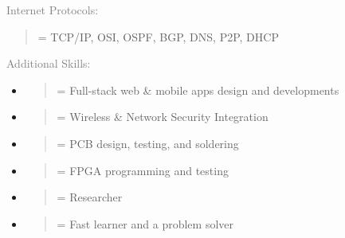 \documentclass[letterpage]{article}
\newlength{\quoteleftskip}            %
\newlength{\quoteleftskipAdditional}  %
\begin{document}
\begin{minipage}[t]{0.424\linewidth}
  \vspace{7px}
  \textcolor{gray}{Internet Protocols:}  \\
  \begin{quote}
      \leftskip=\quoteleftskip
      \textmd{TCP/IP, OSI, OSPF, BGP, DNS, P2P, DHCP}\\
  \end{quote}

  \vspace{7px}
  \textcolor{gray}{Additional Skills:}  \\
  \begin{itemize}[leftmargin=10pt, labelindent=0pt, labelsep=-3mm]
    \raggedright
  \item
    \begin{quote}
        \leftskip=\quoteleftskipAdditional
        \textmd{Full-stack web \& mobile apps design and developments}
    \end{quote}
  \item
    \begin{quote}
        \leftskip=\quoteleftskipAdditional
        \textmd{Wireless \&  Network Security Integration}
    \end{quote}
  \item
    \begin{quote}
        \leftskip=\quoteleftskipAdditional
        \textmd{PCB design, testing, and soldering}
    \end{quote}
  \item
    \begin{quote}
        \leftskip=\quoteleftskipAdditional
        \textmd{FPGA programming and testing}
    \end{quote}
  \item
    \begin{quote}
        \leftskip=\quoteleftskipAdditional
        \textmd{Researcher}
    \end{quote}
  \item
    \begin{quote}
        \leftskip=\quoteleftskipAdditional
        \textmd{Fast learner and a problem solver}
    \end{quote}
  \end{itemize}
\end{minipage}
\end{document}
